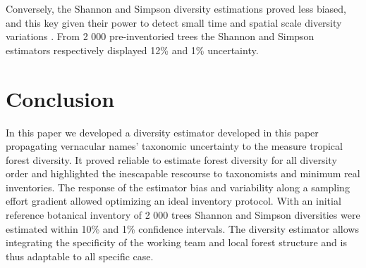 \documentclass[fleqn,10pt]{ArtEcoFoG} %
\begin{document}
Conversely, the Shannon and Simpson diversity estimations proved less
biased, and this key given their power to detect small time and spatial
scale diversity variations
\citep{Baraloto2012a, Berry2008a, Cannon1998, Plumptre1996}. From 2 000
pre-inventoried trees the Shannon and Simpson estimators respectively
displayed 12\% and 1\% uncertainty.

\section{Conclusion}\label{conclusion}

In this paper we developed a diversity estimator developed in this paper
propagating vernacular names' taxonomic uncertainty to the measure
tropical forest diversity. It proved reliable to estimate forest
diversity for all diversity order and highlighted the inescapable
rescourse to taxonomists and minimum real inventories. The response of
the estimator bias and variability along a sampling effort gradient
allowed optimizing an ideal inventory protocol. With an initial
reference botanical inventory of 2 000 trees Shannon and Simpson
diversities were estimated within 10\% and 1\% confidence intervals. The
diversity estimator allows integrating the specificity of the working
team and local forest structure and is thus adaptable to all specific
case.



\makeatletter

\makeatother


\end{document}
